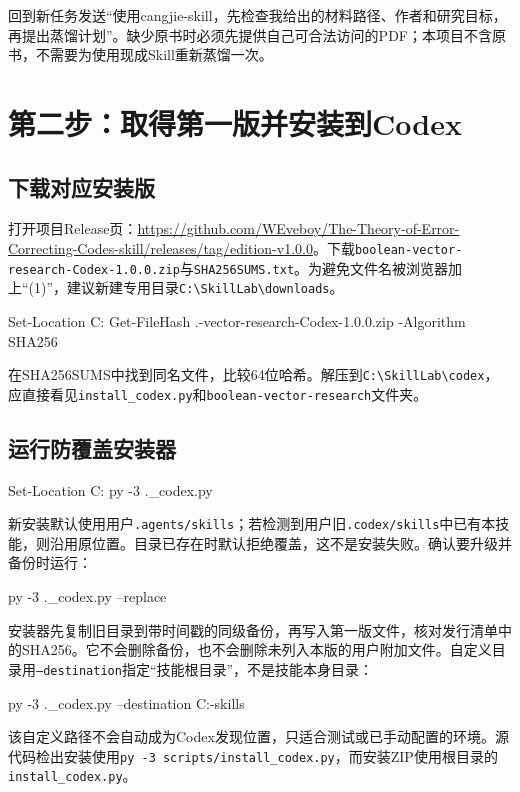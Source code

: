 \documentclass[UTF8,fontset=fandol,zihao=-4]{ctexrep}
\begin{document}
回到新任务发送“使用cangjie-skill，先检查我给出的材料路径、作者和研究目标，再提出蒸馏计划”。缺少原书时必须先提供自己可合法访问的PDF；本项目不含原书，不需要为使用现成Skill重新蒸馏一次。

\chapter{第二步：取得第一版并安装到Codex}
\section{下载对应安装版}
打开项目Release页：\url{https://github.com/WEveboy/The-Theory-of-Error-Correcting-Codes-skill/releases/tag/edition-v1.0.0}。下载\texttt{boolean-vector-research-Codex-1.0.0.zip}与\texttt{SHA256SUMS.txt}。为避免文件名被浏览器加上“(1)”，建议新建专用目录\texttt{C:\textbackslash SkillLab\textbackslash downloads}。
\begin{code}
Set-Location C:\SkillLab\downloads
Get-FileHash .\boolean-vector-research-Codex-1.0.0.zip -Algorithm SHA256
\end{code}
在SHA256SUMS中找到同名文件，比较64位哈希。解压到\texttt{C:\textbackslash SkillLab\textbackslash codex}，应直接看见\texttt{install\_codex.py}和\texttt{boolean-vector-research}文件夹。

\section{运行防覆盖安装器}
\begin{code}
Set-Location C:\SkillLab\codex
py -3 .\install_codex.py
\end{code}
新安装默认使用用户\texttt{.agents/skills}；若检测到用户旧\texttt{.codex/skills}中已有本技能，则沿用原位置。目录已存在时默认拒绝覆盖，这不是安装失败。确认要升级并备份时运行：
\begin{code}
py -3 .\install_codex.py --replace
\end{code}
安装器先复制旧目录到带时间戳的同级备份，再写入第一版文件，核对发行清单中的SHA256。它不会删除备份，也不会删除未列入本版的用户附加文件。自定义目录用\texttt{--destination}指定“技能根目录”，不是技能本身目录：
\begin{code}
py -3 .\install_codex.py --destination C:\SkillLab\my-skills
\end{code}
该自定义路径不会自动成为Codex发现位置，只适合测试或已手动配置的环境。源代码检出安装使用\texttt{py -3 scripts/install\_codex.py}，而安装ZIP使用根目录的\texttt{install\_codex.py}。
\end{document}
